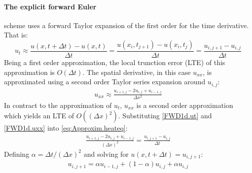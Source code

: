 \documentclass[%
oneside,                 %
final,                   %
10pt]{article}
\begin{document}
\paragraph{The explicit forward Euler} scheme uses a forward Taylor expansion of the first order for the time derivative. That is\citep[p. 305]{HJ15}:
\begin{equation}
u_{t} \approx \frac{u(x, t +\Delta t)- u(x,t)}{\Delta t} =\frac{u(x_i, t_{j+1})- u(x_i,t_j)}{\Delta t} =\frac{u_{i,j+1}- u_{i,j}}{\Delta t} \label{FWD1d.ut}
\end{equation}
Being a first order approximation, the local trunction error (LTE) of this approximation is $O(\Delta t)$. The spatial derivative, in this case $u_{xx}$, is approximated using a second order Taylor series expansion around $u_{i,j}$:
\begin{align}
u_{xx} \approx \frac{u_{i+1,j} -2u_{i,j}+u_{i-1,j}}{\Delta x^2} \label{FWD1d.uxx}
\end{align}
In contract to the approximation of $u_t$, $u_{xx}$ is a second order approximation which yields an LTE of $O((\Delta x)^2)$. Substituting \eqref{FWD1d.ut} and \eqref{FWD1d.uxx} into \eqref{eq:Approxim.heateq}:
\begin{align*}
\frac{u_{i+1,j} -2u_{i,j}+u_{i-1,j}}{(\Delta x)^2}=\frac{u_{i,j+1}- u_{i,j}}{\Delta t} 
\end{align*}
Defining $\alpha=\Delta t/(\Delta x)^2$ and solving for $u(x,t+\Delta t)=u_{i,j+1}$:
\begin{align}
u_{i,j+1}= \alpha u_{i-1,j}+(1-\alpha)u_{i,j}+\alpha u_{i,j} \label{eq:Approximation.FWDnew}
\end{align}
\end{document}

